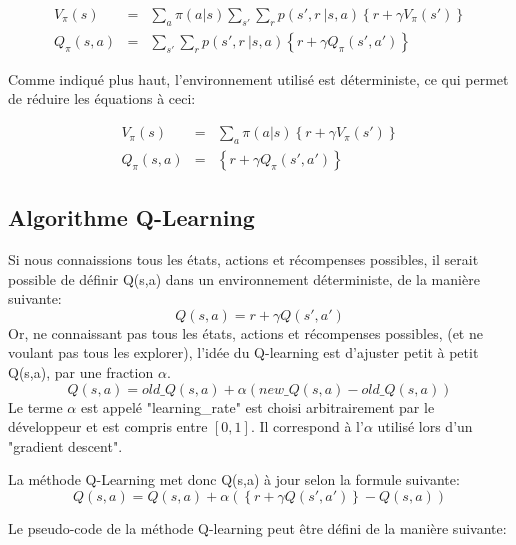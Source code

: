 \documentclass[11pt,a4paper]{report}
\begin{document}
    \begin{eqnarray}
      V_\pi(s) &=& \sum_a\pi(a|s)\sum_{s'}\sum_rp(s',r\ |s,a)\left\{r+\gamma V_\pi(s')\right\} \\
      Q_\pi(s,a) &=& \sum_{s'}\sum_rp(s',r\ |s,a)\left\{r+\gamma Q_\pi(s',a')\right\}
    \end{eqnarray}
    
    \par Comme indiqué plus haut, l'environnement utilisé est déterministe, ce qui permet de réduire les équations à ceci: 
    
    \begin{eqnarray}
      V_\pi(s) &=& \sum_a\pi(a|s)\left\{r+\gamma V_\pi(s')\right\} \\
      Q_\pi(s,a) &=& \left\{r+\gamma Q_\pi(s',a')\right\}
    \end{eqnarray}
    
  \subsection{Algorithme Q-Learning}
  
   \par Si nous connaissions tous les états, actions et récompenses possibles, il serait possible de définir Q(s,a) dans un environnement déterministe, de la manière suivante: 
    $$Q(s,a) = r +  \gamma Q(s',a')$$
    Or, ne connaissant pas tous les états, actions et récompenses possibles, (et ne voulant pas tous les explorer), l'idée du Q-learning est d'ajuster petit à petit Q(s,a), par une fraction $\alpha$.  
    $$Q(s,a) = old\_Q(s,a) + \alpha(new\_Q(s,a) - old\_Q(s,a))$$
    Le terme $\alpha$ est appelé "learning\_rate" est choisi arbitrairement par le développeur et est compris entre $[0,1]$. Il correspond à l'$\alpha$ utilisé lors d'un "gradient descent". 
    
    \par La méthode Q-Learning met donc Q(s,a) à jour selon la formule suivante: 
    $$Q(s,a) = Q(s,a) + \alpha(\left\{  r + \gamma Q(s', a') \right\} - Q(s,a) )$$  
    
    \par Le pseudo-code de la méthode Q-learning peut être défini de la manière suivante: 
  
\end{document}
